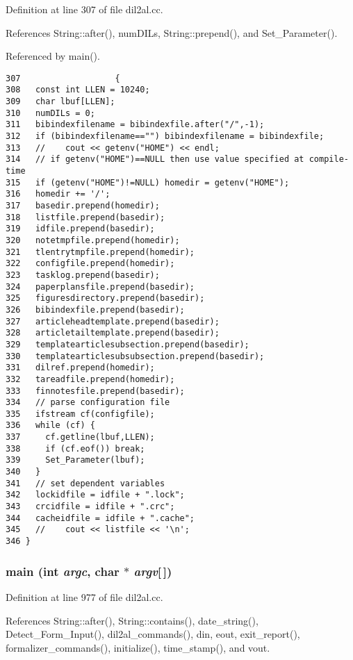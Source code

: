 Definition at line 307 of file dil2al.cc.

References String::after(), num\-DILs, String::prepend(), and Set\_\-Parameter().

Referenced by main().



\footnotesize\begin{verbatim}307                   {
308   const int LLEN = 10240;
309   char lbuf[LLEN];
310   numDILs = 0;
311   bibindexfilename = bibindexfile.after("/",-1);
312   if (bibindexfilename=="") bibindexfilename = bibindexfile;
313   //    cout << getenv("HOME") << endl;
314   // if getenv("HOME")==NULL then use value specified at compile-time
315   if (getenv("HOME")!=NULL) homedir = getenv("HOME");
316   homedir += '/';
317   basedir.prepend(homedir);
318   listfile.prepend(basedir);
319   idfile.prepend(basedir);
320   notetmpfile.prepend(homedir);
321   tlentrytmpfile.prepend(homedir);
322   configfile.prepend(homedir);
323   tasklog.prepend(basedir);
324   paperplansfile.prepend(basedir);
325   figuresdirectory.prepend(basedir);
326   bibindexfile.prepend(basedir);
327   articleheadtemplate.prepend(basedir);
328   articletailtemplate.prepend(basedir);
329   templatearticlesubsection.prepend(basedir);
330   templatearticlesubsubsection.prepend(basedir);
331   dilref.prepend(homedir);
332   tareadfile.prepend(homedir);
333   finnotesfile.prepend(basedir);
334   // parse configuration file
335   ifstream cf(configfile);
336   while (cf) {
337     cf.getline(lbuf,LLEN);
338     if (cf.eof()) break;
339     Set_Parameter(lbuf);
340   }
341   // set dependent variables
342   lockidfile = idfile + ".lock";
343   crcidfile = idfile + ".crc";
344   cacheidfile = idfile + ".cache";
345   //    cout << listfile << '\n';
346 }
\end{verbatim}\normalsize 
{}
\subsubsection{\setlength{\rightskip}{0pt plus 5cm}main (int {\em argc}, char $\ast$ {\em argv}[$\,$])}\label{dil2al_8cc_a115}




Definition at line 977 of file dil2al.cc.

References String::after(), String::contains(), date\_\-string(), Detect\_\-Form\_\-Input(), dil2al\_\-commands(), din, eout, exit\_\-report(), formalizer\_\-commands(), initialize(), time\_\-stamp(), and vout.



